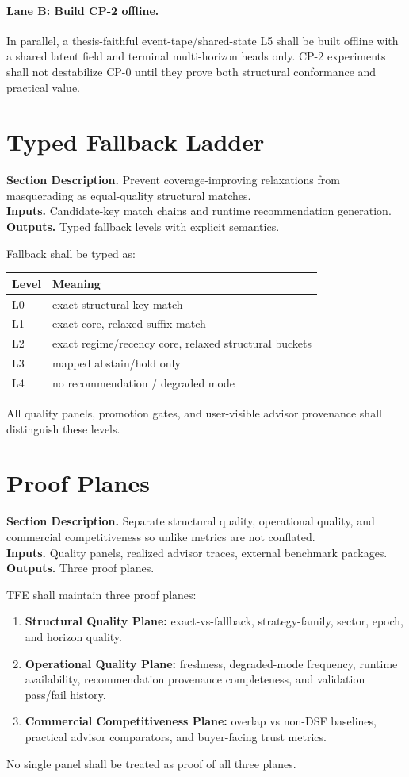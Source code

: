 \documentclass[11pt]{report}
\newcommand{\meta}[3]{\textbf{Section Description.} #1\\
\textbf{Inputs.} #2\\
\textbf{Outputs.} #3\par}
\begin{document}
\paragraph{Lane B: Build CP-2 offline.}
In parallel, a thesis-faithful event-tape/shared-state L5 shall be built offline with a shared latent field and terminal multi-horizon heads only. CP-2 experiments shall not destabilize CP-0 until they prove both structural conformance and practical value.

\section{Typed Fallback Ladder}
\meta{Prevent coverage-improving relaxations from masquerading as equal-quality structural matches.}{Candidate-key match chains and runtime recommendation generation.}{Typed fallback levels with explicit semantics.}

Fallback shall be typed as:
\begin{longtable}{p{}p{}}
\toprule
Level & Meaning \\
\midrule
L0 & exact structural key match \\
L1 & exact core, relaxed suffix match \\
L2 & exact regime/recency core, relaxed structural buckets \\
L3 & mapped abstain/hold only \\
L4 & no recommendation / degraded mode \\
\bottomrule
\end{longtable}
All quality panels, promotion gates, and user-visible advisor provenance shall distinguish these levels.

\section{Proof Planes}
\meta{Separate structural quality, operational quality, and commercial competitiveness so unlike metrics are not conflated.}{Quality panels, realized advisor traces, external benchmark packages.}{Three proof planes.}

TFE shall maintain three proof planes:
\begin{enumerate}[leftmargin=1.2cm]
    \item \textbf{Structural Quality Plane:} exact-vs-fallback, strategy-family, sector, epoch, and horizon quality.
    \item \textbf{Operational Quality Plane:} freshness, degraded-mode frequency, runtime availability, recommendation provenance completeness, and validation pass/fail history.
    \item \textbf{Commercial Competitiveness Plane:} overlap vs non-DSF baselines, practical advisor comparators, and buyer-facing trust metrics.
\end{enumerate}
No single panel shall be treated as proof of all three planes.
\end{document}
